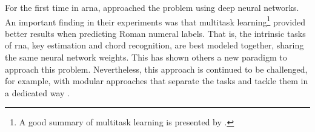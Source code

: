 

For the first time in \gls{arna},
\textcite{chen2018functional} approached the problem using
deep neural networks. An important finding in their
experiments was that multitask learning\footnote{A good
summary of multitask learning is presented by
\textcite{ruder2017overview}.} provided better results when
predicting Roman numeral labels. That is, the intrinsic
tasks of \gls{rna}, key estimation and chord recognition,
are best modeled together, sharing the same neural network
weights. This has shown others a new paradigm to approach
this problem. Nevertheless, this approach is continued to be
challenged, for example, with modular approaches that
separate the tasks and tackle them in a dedicated way
\parencite{mcleod2021modular}.
